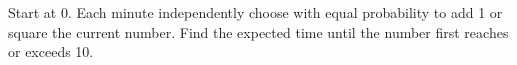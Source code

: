 Start at 0. Each minute independently choose with equal probability to add 1 or square the current number. Find the expected time until the number first reaches or exceeds 10.
